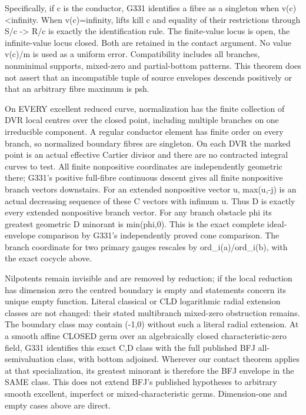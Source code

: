 \documentclass[11pt]{article}
\begin{document}
Specifically, if c is the conductor, G331 identifies a fibre as a singleton when v(c)<infinity. When v(c)=infinity, lifts kill c and equality of their restrictions through S/c -> R/c is exactly the identification rule. The finite-value locus is open, the infinite-value locus closed. Both are retained in the contact argument. No value v(c)/m is used as a uniform error. Compatibility includes all branches, nonminimal supports, mixed-zero and partial-bottom patterns. This theorem does not assert that an incompatible tuple of source envelopes descends positively or that an arbitrary fibre maximum is psh.

On EVERY excellent reduced curve, normalization has the finite collection of DVR local centres over the closed point, including multiple branches on one irreducible component. A regular conductor element has finite order on every branch, so normalized boundary fibres are singleton. On each DVR the marked point is an actual effective Cartier divisor and there are no contracted integral curves to test. All finite nonpositive coordinates are independently geometric there; G331's positive full-fibre continuous descent gives all finite nonpositive branch vectors downstairs. For an extended nonpositive vector u, max(u,-j) is an actual decreasing sequence of these C vectors with infimum u. Thus D is exactly every extended nonpositive branch vector. For any branch obstacle phi its greatest geometric D minorant is min(phi,0). This is the exact complete ideal-envelope comparison by G331's independently proved cone comparison. The branch coordinate for two primary gauges rescales by ord\_i(a)/ord\_i(b), with the exact cocycle above.

Nilpotents remain invisible and are removed by reduction; if the local reduction has dimension zero the centred boundary is empty and statements concern its unique empty function. Literal classical or CLD logarithmic radial extension classes are not changed: their stated multibranch mixed-zero obstruction remains. The boundary class may contain (-1,0) without such a literal radial extension. At a smooth affine CLOSED germ over an algebraically closed characteristic-zero field, G331 identifies this exact C,D class with the full published BFJ all-semivaluation class, with bottom adjoined. Wherever our contact theorem applies at that specialization, its greatest minorant is therefore the BFJ envelope in the SAME class. This does not extend BFJ's published hypotheses to arbitrary smooth excellent, imperfect or mixed-characteristic germs. Dimension-one and empty cases above are direct.
\end{document}
